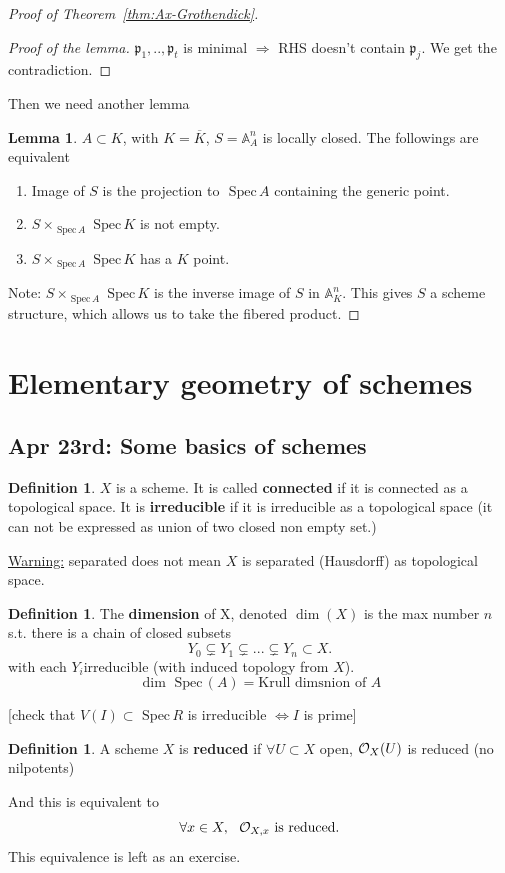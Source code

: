 \documentclass[11pt]{article}
\theoremstyle{definition}
\newtheorem{lemma}[thm]{Lemma}
\newtheorem{dfn}[thm]{Definition}
\newcommand{\spec}{\text{ Spec}\,}
\newcommand{\affn}{\mathbb A}
\newcommand{\scp}{{\mathfrak p}}
\newcommand{\calo}{{\cal O}}
\newcommand{\Lrta}{\Longrightarrow}
\newcommand{\Llrta}{\Longleftrightarrow}
\begin{document}
\begin{proof}[Proof of Theorem~\ref{thm:Ax-Grothendick}]
\begin{proof}[Proof of the lemma]
$\scp_1,..,\scp_t$ is minimal $\Lrta $ RHS doesn't contain $\scp_j$. We get the contradiction.
\end{proof}

Then we need another lemma
\begin{lemma}


$A\subset K$, with $ K=\overline{K}$, $S=\affn^n_A$ is locally closed. The followings are equivalent
\begin{enumerate}[label=(\arabic*)]
\item Image of $S$ is the projection to $\spec A$ containing the generic point.
\item $S\times_{\spec A}\spec K$ is not empty.
\item $S\times_{\spec A}\spec K$ has a $K$ point. 
\end{enumerate}
\end{lemma}

Note: $S\times_{\spec A}\spec K$ is the inverse image of $S$ in $\affn^n_K$. This gives  $S$ a scheme structure, which allows us to take the fibered product.
\end{proof}
\section{Elementary geometry of schemes}
\subsection{Apr 23rd: Some basics of schemes}
\begin{dfn}
$X$ is a scheme. It is called \textbf{connected} if it is connected as a topological space. It is \textbf{irreducible} if it is irreducible as a topological space (it can not be expressed as union of two closed non empty set.)
\end{dfn}
\underline{Warning:} separated does not mean $X$ is separated (Hausdorff) as topological space.

\begin{dfn}
The \textbf{dimension} of X, denoted $\dim(X)$ is the max number $n$ s.t. there is a chain of closed subsets
$$
Y_0\subsetneq Y_1\subsetneq ...\subsetneq Y_n \subset X.
$$ with each $Y_i$irreducible (with induced topology from $X$).
$$
\dim \spec (A)=\text{Krull dimsnion of $A$}
$$ 
\end{dfn}
[check that $V(I)\subset \spec R$ is irreducible $\Llrta I$ is prime] 

\begin{dfn}
A scheme $X$ is \textbf{reduced} if $\forall U\subset X$ open, $\calo_X(U)$ is reduced (no nilpotents)

And this is equivalent to 
$$
\forall x\in X,\ \  \calo_{X,x} \text{ is reduced.}
$$
This equivalence is left as an exercise.
\end{dfn}
\end{document}
